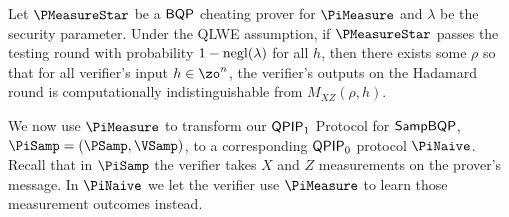 \begin{lemma}
	\label{lem:urmila-binding}
	Let $\PMeasureStar$ be a $\operatorname{\mathsf{BQP}}$ cheating prover for $\PiMeasure$ and $\lambda$ be the security parameter. Under the QLWE assumption, if $\PMeasureStar$ passes the testing round with probability $1-\negl(\lambda)$ for all $h$, then there exists some $\rho$ so that for all verifier's input $h \in \zo^n$, the verifier's outputs on the Hadamard round is computationally indistinguishable from $M_{XZ}(\rho, h)$.
	\iffalse    
	Suppose that for all $\lambda\in\bbN$ and $h\in\zo^*$ \Ethan{or $\zo^n$?},
	$\PMeasureStar$ passes the testing round with probability $1-\negl(\lambda)$.
	Then, under the QLWE assumption, there exists some $\rho$ so that for all $h$,
	The verifier's output on the Hadamard round is $\negl(\lambda)$-computationally indistinguishable from $M_{XZ}(\rho, h)$.
	\fi
\end{lemma}

We now use $\PiMeasure$ to transform our $\operatorname{\mathsf{QPIP}}_1$ Protocol for $\operatorname{\mathsf{SampBQP}}$, $\PiSamp=(\PSamp, \VSamp)$, to a corresponding $\operatorname{\mathsf{QPIP}}_0$ protocol $\PiNaive$.
Recall that in $\PiSamp$ the verifier takes $X$ and $Z$ measurements on the prover's message.
In $\PiNaive$ we let the verifier use $\PiMeasure$ to learn those measurement outcomes instead.

